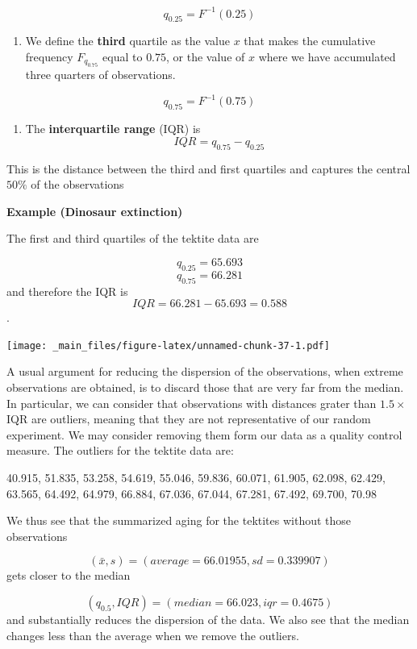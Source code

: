 \documentclass[
]{book}
\providecommand{\tightlist}{%
  \setlength{\itemsep}{0pt}\setlength{\parskip}{0pt}}
\begin{document}
\[q_{0.25}=F^{-1}(0.25)\]

\begin{enumerate}
\def\labelenumi{\arabic{enumi})}
\setcounter{enumi}{1}
\tightlist
\item
  We define the \textbf{third} quartile as the value \(x\) that makes the cumulative frequency \(F_{q_{0.75}}\) equal to \(0.75\), or the value of \(x\) where we have accumulated three quarters of observations.
\end{enumerate}

\[q_{0.75}=F^{-1}(0.75)\]

\begin{enumerate}
\def\labelenumi{\arabic{enumi})}
\setcounter{enumi}{2}
\tightlist
\item
  The \textbf{interquartile range} (IQR) is \[IQR=q_{0.75} - q_{0.25}\]
\end{enumerate}

This is the distance between the third and first quartiles and captures the central \(50\%\) of the observations

\textbf{Example (Dinosaur extinction)}

The first and third quartiles of the tektite data are

\[q_{0.25}=65.693\]
\[q_{0.75}=66.281\]
and therefore the IQR is \[IQR=66.281-65.693=0.588\].

\texttt{[image: \_main\_files/figure-latex/unnamed-chunk-37-1.pdf]}

A usual argument for reducing the dispersion of the observations, when extreme observations are obtained, is to discard those that are very far from the median. In particular, we can consider that observations with distances grater than \(1.5\times\)IQR are outliers, meaning that they are not representative of our random experiment. We may consider removing them form our data as a quality control measure. The outliers for the tektite data are:

40.915, 51.835, 53.258, 54.619, 55.046, 59.836, 60.071, 61.905, 62.098, 62.429, 63.565, 64.492, 64.979, 66.884, 67.036, 67.044, 67.281, 67.492, 69.700, 70.98

We thus see that the summarized aging for the tektites without those observations

\[(\bar{x}, s)= (average=66.01955, sd=0.339907)\]
gets closer to the median

\[(q_{0.5}, IQR)= (median=66.023, iqr=0.4675)\]
and substantially reduces the dispersion of the data. We also see that the median changes less than the average when we remove the outliers.
\end{document}
